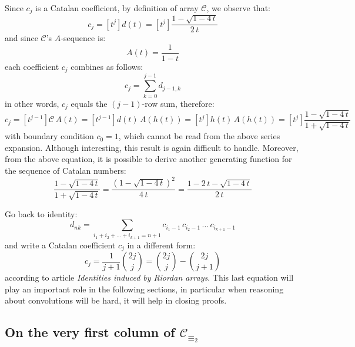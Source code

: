 Since $c_{j}$ is a Catalan coefficient, 
by definition of array $\mathcal{C}$, we observe that:
\begin{displaymath}
    c_{j} = [t^{j}]d(t)= [t^{j}]\frac{1-\sqrt{1-4\,t}}{2\,t}
\end{displaymath}
and since $\mathcal{C}$'s $A$-sequence is:
\begin{displaymath}
    A(t)=\frac{1}{1-t}
\end{displaymath}
each coefficient $c_{j}$ combines as follows:
\begin{displaymath}
    c_{j} = \sum_{k=0}^{j-1}{d_{j-1,k}}
\end{displaymath}
in other words, $c_{j}$ equals the $(j-1)$-row sum, therefore:
\begin{displaymath}
    c_{j} = [t^{j-1}]\mathcal{C}\,A(t)
          = [t^{j-1}]d(t)\,A(h(t))
          = [t^{j}]h(t)\,A(h(t))
          = [t^{j}]\frac{1-\sqrt{1-4 \, t}}{1+\sqrt{1-4 \, t}}
\end{displaymath}
with boundary condition $c_{0}=1$, which cannot be read from the above
series expansion. Although interesting, this result is again difficult to
handle. Moreover, from the above equation, it is possible to derive
another generating function for the sequence of Catalan numbers:
\begin{displaymath}
    \frac{1-\sqrt{1-4 \, t}}{1+\sqrt{1-4 \, t}}=
    \frac{\left(1-\sqrt{1-4 \, t}\right)^{2}}{4 \, t}=
    \frac{1-2\,t-\sqrt{1-4 \, t}}{2 \, t}
\end{displaymath}

Go back to identity:
\begin{displaymath}
    d_{nk} = \sum_{i_{1}+ i_{2}+ \ldots+ i_{k+1}=n+1}{
            c_{i_{1}-1}\,c_{i_{2}-1}\,\ldots\,c_{i_{k+1}-1} }
\end{displaymath}
and write a Catalan coefficient $c_{j}$ in a different form:
\begin{equation}
    c_{j} = \frac{1}{j+1}{{2j}\choose{j}} 
        = {{2j}\choose{j}} - {{2j}\choose{j+1}}
    \label{eq:catalan:coeff:rewriting}
\end{equation}
according to article \emph{Identities induced by Riordan arrays}. This
last equation will play an important role in the following sections, in
particular when reasoning about convolutions will be hard, it will 
help in closing proofs.

\subsection{On the very first column of $\mathcal{C}_{\equiv_{2}}$}

